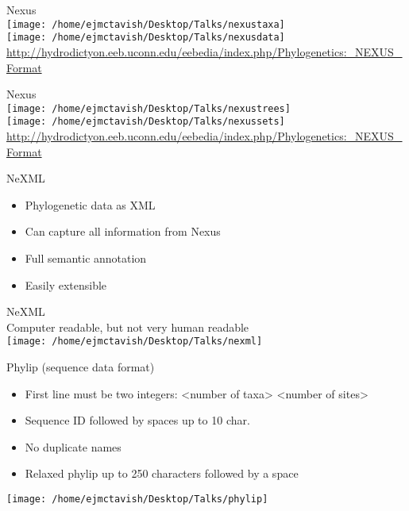 \documentclass{beamer}
\begin{document}
\begin{frame}
Nexus\\
\texttt{[image: /home/ejmctavish/Desktop/Talks/nexustaxa]}\\
\texttt{[image: /home/ejmctavish/Desktop/Talks/nexusdata]}\\
\url{http://hydrodictyon.eeb.uconn.edu/eebedia/index.php/Phylogenetics:_NEXUS_Format}
\end{frame}
\begin{frame}
Nexus\\
\texttt{[image: /home/ejmctavish/Desktop/Talks/nexustrees]}\\
\texttt{[image: /home/ejmctavish/Desktop/Talks/nexussets]}\\
\url{http://hydrodictyon.eeb.uconn.edu/eebedia/index.php/Phylogenetics:_NEXUS_Format}
\end{frame}


\begin{frame}
NeXML\\
\begin{itemize}
 \item Phylogenetic data as XML
 \item Can capture all information from Nexus
 \item Full semantic annotation
 \item Easily extensible
\end{itemize}
\end{frame}

\begin{frame}
NeXML\\
Computer readable, but not very human readable\\
\texttt{[image: /home/ejmctavish/Desktop/Talks/nexml]}\\
\end{frame}


\begin{frame}
 Phylip (sequence data format)\\
\begin{itemize}
 \item First line must be two integers: <number of taxa> <number of sites>
 \item Sequence ID followed by spaces up to 10 char. 
 \item No duplicate names
 \item Relaxed phylip up to 250 characters followed by a space
\end{itemize}
\texttt{[image: /home/ejmctavish/Desktop/Talks/phylip]}
\end{frame}
\end{document}
